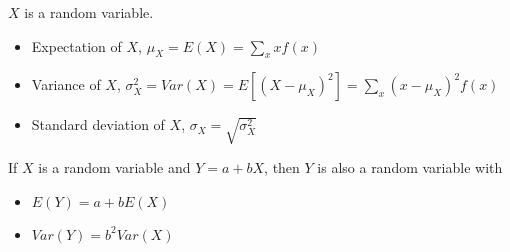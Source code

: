 \documentclass{./../handout}
\begin{document}
\thispagestyle{plain}
\begin{center}
\end{center}	
$X$ is a random variable. \vspace{-1em}
\begin{itemize}
  \item Expectation of $X$, $\mu_X = E(X) = \sum_{x} x f(x) $
  \item Variance of $X$, $\sigma^2_X = Var(X) = E[(X-\mu_X)^2] = \sum_{x} (x-\mu_X)^2 f(x) $
  \item Standard deviation of $X$, $\sigma_X = \sqrt{\sigma_X^2}$
\end{itemize}
If $X$ is a random variable and $Y=a+bX$, then $Y$ is also a random variable with \vspace{-1em}
\begin{itemize}
\item $ E(Y) = a + b E(X)$ 
\item $Var(Y) = b^2 Var(X) $ \\~\\
\end{itemize}
\end{document}

